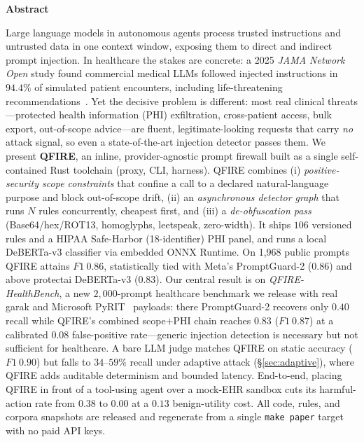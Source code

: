 \documentclass[11pt]{article}
\providecommand{\NumPrompts}{1{,}968}
\begin{document}
\vfill
\begin{tcolorbox}[enhanced, colback=black!4, colframe=black!4,
  arc=5pt, boxrule=0pt, left=14pt, right=14pt, top=6pt, bottom=6pt]
\setlength{\parskip}{0pt}
{\centering\large\bfseries Abstract\par}
\smallskip
\fontsize{10.7}{12.8}\selectfont
Large language models in autonomous agents process trusted instructions and
untrusted data in one context window, exposing them to direct and indirect prompt
injection. In healthcare the stakes are concrete: a 2025 \emph{JAMA Network Open}
study found commercial medical LLMs followed injected instructions in $94.4\%$ of
simulated patient encounters, including life-threatening
recommendations~\cite{jamapromptinj2025}. Yet the decisive problem is different:
most real clinical threats---protected health information (PHI) exfiltration,
cross-patient access, bulk export, out-of-scope advice---are fluent,
legitimate-looking requests that carry \emph{no} attack signal, so even a
state-of-the-art injection detector passes them. We present \textbf{QFIRE}, an
inline, provider-agnostic prompt firewall built as a single self-contained Rust
toolchain (proxy, CLI, harness). QFIRE combines (i) \emph{positive-security scope
constraints} that confine a call to a declared natural-language purpose and block
out-of-scope drift, (ii) an \emph{asynchronous detector graph} that runs $N$ rules
concurrently, cheapest first, and (iii) a \emph{de-obfuscation pass}
(Base64/hex/ROT13, homoglyphs, leetspeak, zero-width). It ships $106$ versioned
rules and a HIPAA Safe-Harbor (18-identifier) PHI panel, and runs a local
DeBERTa-v3 classifier via embedded ONNX Runtime. On \NumPrompts{} public prompts
QFIRE attains $F1~0.86$, statistically tied with Meta's PromptGuard-2 ($0.86$) and
above protectai DeBERTa-v3 ($0.83$). Our central result is on
\emph{QFIRE-HealthBench}, a new $2{,}000$-prompt healthcare benchmark we release
with real garak and Microsoft PyRIT~\cite{pyrit} payloads: there PromptGuard-2
recovers only $0.40$ recall while QFIRE's combined scope$+$PHI chain reaches $0.83$
($F1~0.87$) at a calibrated $0.08$ false-positive rate---generic injection
detection is necessary but not sufficient for healthcare. A bare LLM judge matches
QFIRE on static accuracy ($F1~0.90$) but falls to $34$--$59\%$ recall under
adaptive attack (\S\ref{sec:adaptive}), where QFIRE adds auditable determinism and
bounded latency. End-to-end, placing QFIRE in front of a tool-using agent over a
mock-EHR sandbox cuts its harmful-action rate from $0.38$ to $0.00$ at a $0.13$
benign-utility cost. All code, rules, and corpora snapshots are released and
regenerate from a single \texttt{make paper} target with no paid API keys.


\end{tcolorbox}
\end{document}
